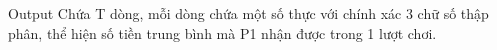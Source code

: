 Output
Chứa T dòng, mỗi dòng chứa một số thực với chính xác 3 chữ số thập phân, thể hiện số tiền trung bình mà P1 nhận được trong 1 lượt chơi.